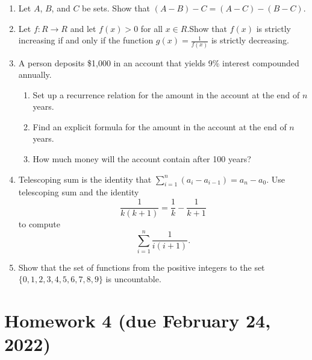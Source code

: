 \documentclass[letterpaper, 12pt]{article}
\begin{document}
\begin{enumerate}
    \item Let $A$, $B$, and $C$ be sets. Show that $(A-B)-C = (A-C)-(B-C)$.
    \item Let $f : R \to R$ and let $f(x) > 0$ for all $x \in R$.Show that $f(x)$ is strictly increasing if and only if the function $g(x) = \frac{1}{f(x)}$ is strictly decreasing.
    \item A person deposits \$1,000 in an account that yields 9\% interest compounded annually.
    \begin{enumerate}
        \item Set up a recurrence relation for the amount in the account at the end of $n$ years.
        \item Find an explicit formula for the amount in the account at the end of $n$ years.
        \item How much money will the account contain after 100 years?
    \end{enumerate}
    \item Telescoping sum is the identity that $\sum^{n}_{i=1}(a_i - a_{i-1}) = a_n - a_0$. Use telescoping sum and the identity
    \[\frac{1}{k(k+1)} = \frac{1}{k} - \frac{1}{k+1}\]
    to compute
    \[\sum_{i=1}^{n} \frac{1}{i(i+1)}.\]
    \item Show that the set of functions from the positive integers to the set $\{ 0, 1, 2, 3, 4, 5, 6, 7, 8, 9 \}$ is uncountable.
\end{enumerate}

\section*{Homework 4 (due February 24, 2022)}
\end{document}
